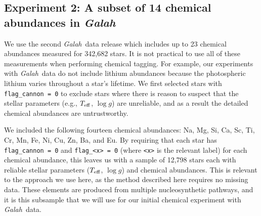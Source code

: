 \documentclass[twocolumn]{aastex61}
\newcommand\teff{T_{\rm eff}}
\newcommand\logg{\log{g}}
\newcommand{\project}[1]{\textsl{#1}}
\newcommand{\Galah}{\project{Galah}}
\begin{document}



\subsection{Experiment 2: A subset of 14 chemical abundances in \Galah}
\label{sec:experiment-galah}


We use the second \Galah\ data release \citep{Buder:2018a} which
includes up to 23 chemical abundances measured for 342,682
stars. It is not practical to use all of these measurements
when performing chemical tagging. For example, our experiments
with \Galah\ data do not include lithium abundances because the
photospheric lithium varies throughout a star's lifetime. 
We first selected stars with \texttt{flag\_cannon = 0} to exclude
stars where there is reason to suspect that the stellar parameters
(e.g., $\teff$, $\logg$) are unreliable, and as a result the 
detailed chemical abundances are untrustworthy. 

We included the following fourteen chemical abundances: Na, Mg, 
Si, Ca, Sc, Ti, Cr, Mn, Fe, Ni, Cu, Zn, Ba, and Eu.
By requiring that each star has \texttt{flag\_cannon = 0} and
\texttt{flag\_<x> = 0} (where \texttt{<x>} is the relevant label)
for each chemical abundance, this leaves
us with a sample of 12,798 stars each with reliable stellar
parameters ($\teff$, $\logg$) and chemical abundances.
This is relevant to the approach we use here, as the method
described here requires no missing data.
These elements are produced from multiple nucleosynthetic
pathways, and it is this subsample that we will use for 
our initial chemical experiment with \Galah\ data.

\end{document}
